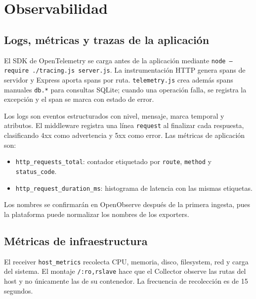 \documentclass[12pt,a4paper]{article}
\begin{document}
\section{Observabilidad}

\subsection{Logs, métricas y trazas de la aplicación}

El SDK de OpenTelemetry se carga antes de la aplicación mediante \texttt{node --require ./tracing.js server.js}. La instrumentación HTTP genera spans de servidor y Express aporta spans por ruta. \texttt{telemetry.js} crea además spans manuales \texttt{db.*} para consultas SQLite; cuando una operación falla, se registra la excepción y el span se marca con estado de error.

Los logs son eventos estructurados con nivel, mensaje, marca temporal y atributos. El middleware registra una línea \texttt{request} al finalizar cada respuesta, clasificando 4xx como advertencia y 5xx como error. Las métricas de aplicación son:

\begin{itemize}
  \item \texttt{http\_requests\_total}: contador etiquetado por \texttt{route}, \texttt{method} y \texttt{status\_code}.
  \item \texttt{http\_request\_duration\_ms}: histograma de latencia con las mismas etiquetas.
\end{itemize}

Los nombres se confirmarán en OpenObserve después de la primera ingesta, pues la plataforma puede normalizar los nombres de los exporters.

\subsection{Métricas de infraestructura}

El receiver \texttt{host\_metrics} recolecta CPU, memoria, disco, filesystem, red y carga del sistema. El montaje \texttt{/:ro,rslave} hace que el Collector observe las rutas del host y no únicamente las de su contenedor. La frecuencia de recolección es de 15 segundos.
\end{document}

